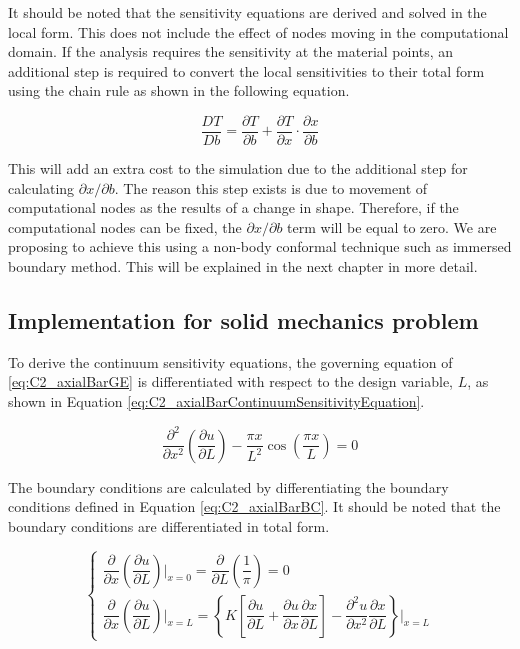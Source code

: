 It should be noted that the sensitivity equations are derived and solved in the local form. This does not include the effect of nodes moving in the computational domain. If the analysis requires the sensitivity at the material points, an additional step is required to convert the local sensitivities to their total form using the chain rule as shown in the following equation.

\begin{equation*}
    \frac{DT}{Db} = \frac{\partial T}{\partial b} + \frac{\partial T}{\partial x} \cdot \frac{\partial x}{\partial b}
\end{equation*}

This will add an extra cost to the simulation due to the additional step for calculating $\partial x/\partial b$. The reason this step exists is due to movement of computational nodes as the results of a change in shape. Therefore, if the computational nodes can be fixed, the $\partial x/\partial b$ term will be equal to zero. We are proposing to achieve this using a non-body conformal technique such as immersed boundary method. This will be explained in the next chapter in more detail.

\subsection{Implementation for solid mechanics problem}
To derive the continuum sensitivity equations, the governing equation of \eqref{eq:C2_axialBarGE} is differentiated with respect to the design variable, $L$, as shown in Equation \eqref{eq:C2_axialBarContinuumSensitivityEquation}.

\begin{equation}\label{eq:C2_axialBarContinuumSensitivityEquation}
    \frac{\partial^2}{\partial x^2} \left( \frac{\partial u}{\partial L} \right) - 
    \frac{\pi x}{L^2} \cos \left( \frac{\pi x}{L} \right) = 0
\end{equation}

The boundary conditions are calculated by differentiating the boundary conditions defined in Equation \eqref{eq:C2_axialBarBC}. It should be noted that the boundary conditions are differentiated in total form.

\begin{equation}\label{eq:C2_axialBarContinuumSensitivityBoundaryConditions}
    \begin{cases}
    \dfrac{\partial}{\partial x} \left( \dfrac{\partial u}{\partial L} \right) \bigg|_{x = 0} = 
    \dfrac{\partial }{\partial L} \left( \dfrac{1}{\pi} \right) = 0
    \\
    \dfrac{\partial}{\partial x} \left( \dfrac{\partial u}{\partial L} \right) \bigg|_{x = L} = 
    \left\{
    K \left[ \dfrac{\partial u}{\partial L} + \dfrac{\partial u}{\partial x} \dfrac{\partial x}{\partial L} \right] - 
    \dfrac{\partial^2 u}{\partial x^2} \dfrac{\partial x}{\partial L}
    \right\} \bigg|_{x = L}
    \end{cases}
\end{equation}

